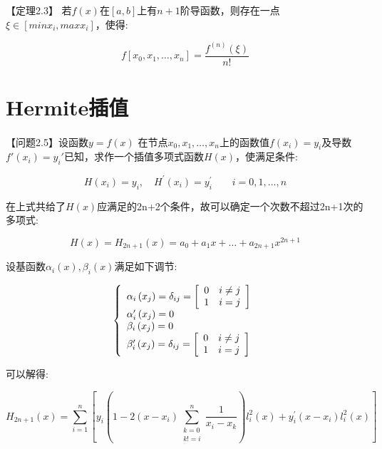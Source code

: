 \documentclass[12pt]{report}
\begin{document}
【定理2.3】 \quad 若$f(x)$在$[a, b]$上有$n+1$阶导函数，则存在一点$\xi \in [min x_i, max x_i]$，使得:

\[
	f[x_0, x_1, \ldots , x_n] = \frac{f^{(n)}(\xi)}{n!}
\]


\section{Hermite插值}

\paragraph{ } 【问题2.5】\quad 设函数$y=f(x)$
在节点$x_0,x_1,\dots,x_n$上的函数值$f(x_i)=y_i$及导数$f'(x_i)=y_i'$已知，求作一个插值多项式函数$H(x)$，使满足条件:

\[
	H(x_i) = y_i, \quad H^\prime (x_i) = y^\prime_i \quad \quad i = 0, 1, \ldots , n
\]

在上式共给了$H(x)$应满足的2n+2个条件，故可以确定一个次数不超过2n+1次的多项式:

\[
	H(x) = H_{2n+1}(x) = a_0 + a_1 x + \ldots + a_{2n+1} x^{2n+1}
\]

设基函数$\alpha_i(x),\beta_i(x)$满足如下调节:

\begin{equation}
	\notag
	\left\{\begin{array}{l}
	\alpha_{i}\left(x_{j}\right)=\delta_{i j}=\left[\begin{array}{ll}
	0 & i \neq j \\
	1 & i=j
	\end{array}\right] \\
	\alpha_{i}^{\prime}\left(x_{j}\right)=0 \\
	\beta_{i}\left(x_{j}\right)=0 \\
	\beta_{i}^{\prime}\left(x_{j}\right)=\delta_{i j}=\left[\begin{array}{ll}
	0 & i \neq j \\
	1 & i=j
	\end{array}\right] \\
	\end{array}\right.
\end{equation}

可以解得:

\begin{equation}
	H_{2n+1}(x) = \sum_{i=1}^n\left[y_i \left(1 - 2\left(x - x_i\right) \sum_{\substack{k=0 \\ k!=i}}^n
	\frac{1}{x_i - x_k}\right)l_{i}^2 (x) + y_{i}^\prime (x - x_i)l_{i}^2 (x)\right]
	\tag{2.13} \label{2.13}
\end{equation}
\end{document}

